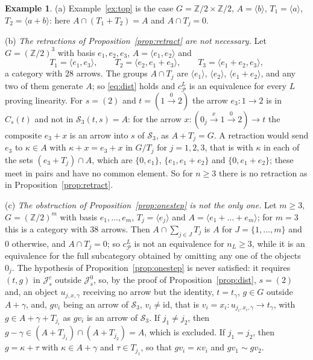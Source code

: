 \documentclass[11pt]{amsart}
\theoremstyle{definition}
\newtheorem{ex}[thm]{Example}
\newcommand{\cP}{\mathcal P}
\newcommand{\cS}{\mathcal S}
\newcommand{\cJ}{\mathcal J}
\newcommand{\id}{\mathrm{id}}
\begin{document}
\begin{ex}\label{ex:dist}
(a) Example~\ref{ex:top} is the case $G=\mathbb Z/2\times\mathbb Z/2$,
$A=\langle b\rangle$, $T_1=\langle a\rangle$, $T_2=\langle a+b
\rangle$: here $A\cap(T_1+T_2)=A$ and $A\cap T_j=0$.

(b) \emph{The retractions of Proposition~\ref{prop:retract} are not
necessary.} Let $G=(\mathbb Z/2)^3$ with basis $e_1,e_2,e_3$, $A=
\langle e_1,e_2\rangle$ and
\[
T_1=\langle e_1,e_3\rangle,\qquad T_2=\langle e_2,e_1+e_3\rangle,
\qquad T_3=\langle e_1+e_2,e_3\rangle,
\]
a category with $28$ arrows. The groups $A\cap T_j$ are $\langle e_1
\rangle$, $\langle e_2\rangle$, $\langle e_1+e_2\rangle$, and any two
of them generate $A$; so \eqref{eq:dist} holds and $c^L_\cP$ is an
equivalence for every $L$ proving linearity. For $s=(2)$ and $t=(1
\xrightarrow{0}2)$ the arrow $e_3\colon1\to2$ is in $C_s(t)$ and not in
$\cS_3(t,s)=A$: for the arrow $x\colon(0_j\xrightarrow{x}1
\xrightarrow{0}2)\to t$ the composite $e_3+x$ is an arrow into $s$ of
$\cS_3$, as $A+T_j=G$. A retraction would send $e_3$ to $\kappa\in A$
with $\kappa+x=e_3+x$ in $G/T_j$ for $j=1,2,3$, that is with $\kappa$
in each of the sets $(e_3+T_j)\cap A$, which are $\{0,e_1\}$,
$\{e_1,e_1+e_2\}$ and $\{0,e_1+e_2\}$; these meet in pairs and have no
common element. So for $n\ge3$ there is no retraction as in
Proposition~\ref{prop:retract}.

(c) \emph{The obstruction of Proposition~\ref{prop:onestep} is not the
only one.} Let $m\ge3$, $G=(\mathbb Z/2)^m$ with basis $e_1,\dots,e_m$,
$T_j=\langle e_j\rangle$ and $A=\langle e_1+\dots+e_m\rangle$; for
$m=3$ this is a category with $38$ arrows. Then $A\cap\sum_{j\in J}T_j$
is $A$ for $J=\{1,\dots,m\}$ and $0$ otherwise, and $A\cap T_j=0$; so
$c^L_\cP$ is not an equivalence for $n_L\ge3$, while it is an
equivalence for the full subcategory obtained by omitting any one of
the objects $0_j$. The hypothesis of Proposition~\ref{prop:onestep} is
never satisfied: it requires $(t,g)$ in $\cJ^c_s$ outside $\cJ^0_s$,
so, by the proof of Proposition~\ref{prop:dist}, $s=(2)$ and, an
object $u_{j,x,\gamma}$ receiving no arrow but the identity, $t=
t_\gamma$, $g\in G$ outside $A+\gamma$, and, $gv_i$ being an arrow of
$\cS_3$, $v_i\ne\id$, that is $v_i=x_i\colon
u_{j_i,x_i,\gamma}\to t_\gamma$, with $g\in A+\gamma+T_{j_i}$ as
$gv_i$ is an arrow of $\cS_3$. If $j_1\ne j_2$, then $g-\gamma\in
(A+T_{j_1})\cap(A+T_{j_2})=A$, which is excluded. If $j_1=j_2$, then
$g=\kappa+\tau$ with $\kappa\in A+\gamma$ and $\tau\in T_{j_1}$, so
that $gv_i=\kappa v_i$ and $gv_1\sim gv_2$.
\end{ex}
\end{document}
